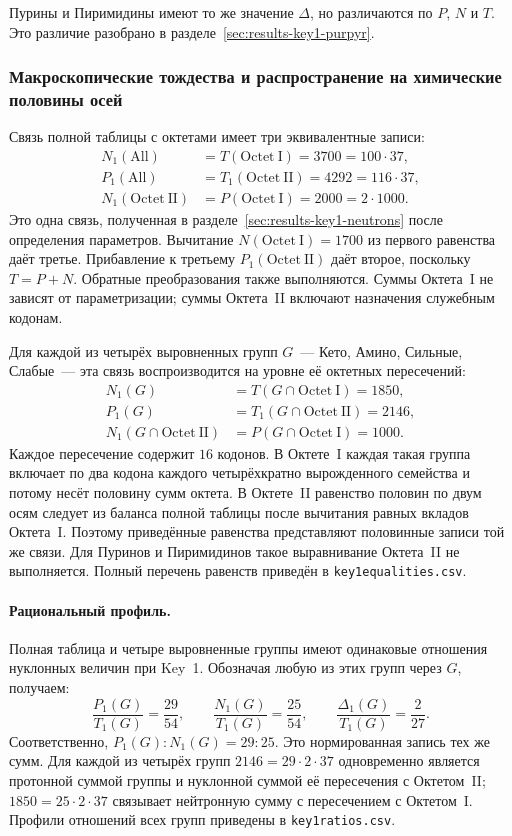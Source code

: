 \documentclass[11pt,a4paper]{article}
\renewcommand{\_}{\origunderscore\allowbreak}
\begin{document}
Пурины и Пиримидины имеют то же значение $\Delta$, но
различаются по $P$, $N$ и $T$. Это различие разобрано
в разделе~\ref{sec:results-key1-purpyr}.

\subsubsection{Макроскопические тождества и распространение на химические половины осей}
\label{sec:results-key1-macroidentities}

Связь полной таблицы с октетами имеет три эквивалентные записи:
\begin{align*}
N_1(\mathrm{All})
&=T(\mathrm{Octet~I})=3700=100\cdot37,\\
P_1(\mathrm{All})
&=T_1(\mathrm{Octet~II})=4292=116\cdot37,\\
N_1(\mathrm{Octet~II})
&=P(\mathrm{Octet~I})=2000=2\cdot1000.
\end{align*}
Это одна связь, полученная в
разделе~\ref{sec:results-key1-neutrons} после определения
параметров. Вычитание $N(\mathrm{Octet~I})=1700$ из
первого равенства даёт третье. Прибавление к третьему
$P_1(\mathrm{Octet~II})$ даёт второе, поскольку
$T=P+N$. Обратные преобразования также выполняются.
Суммы Октета~I не зависят от параметризации; суммы
Октета~II включают назначения служебным кодонам.

Для каждой из четырёх выровненных групп $G$~--- Кето,
Амино, Сильные, Слабые~--- эта связь воспроизводится
на уровне её октетных пересечений:
\[
\begin{aligned}
N_1(G)&=T(G\cap\mathrm{Octet~I})=1850,\\
P_1(G)&=T_1(G\cap\mathrm{Octet~II})=2146,\\
N_1(G\cap\mathrm{Octet~II})
&=P(G\cap\mathrm{Octet~I})=1000.
\end{aligned}
\]
Каждое пересечение содержит $16$ кодонов. В Октете~I
каждая такая группа включает по два кодона каждого
четырёхкратно вырожденного семейства и потому несёт
половину сумм октета. В Октете~II равенство половин
по двум осям следует из баланса полной таблицы после
вычитания равных вкладов Октета~I. Поэтому приведённые
равенства представляют половинные записи той же связи.
Для Пуринов и Пиримидинов такое выравнивание Октета~II
не выполняется. Полный перечень равенств приведён в
\texttt{key1\_equalities.csv}.

\paragraph{Рациональный профиль.}
Полная таблица и четыре выровненные группы имеют
одинаковые отношения нуклонных величин при Key~1.
Обозначая любую из этих групп через $G$, получаем:
\[
\frac{P_1(G)}{T_1(G)}=\frac{29}{54},\qquad
\frac{N_1(G)}{T_1(G)}=\frac{25}{54},\qquad
\frac{\Delta_1(G)}{T_1(G)}=\frac{2}{27}.
\]
Соответственно, $P_1(G):N_1(G)=29:25$.
Это нормированная запись тех же сумм. Для каждой из
четырёх групп $2146=29\cdot2\cdot37$ одновременно
является протонной суммой группы и нуклонной суммой
её пересечения с Октетом~II; $1850=25\cdot2\cdot37$
связывает нейтронную сумму с пересечением с Октетом~I.
Профили отношений всех групп приведены в
\texttt{key1\_ratios.csv}.
\end{document}
